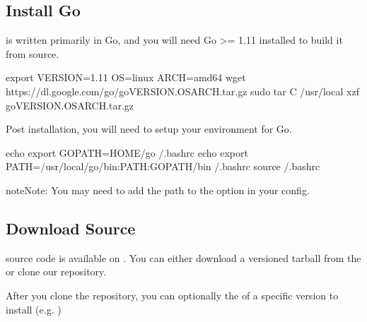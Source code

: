 \documentclass[letterpaper,10pt,english]{sphinxmanual}
\begin{document}
\subsection{Install Go}
\label{\detokenize{admin_quickstart:install-go}}
 is written primarily in Go, and you will need Go \textgreater{}= 1.11
installed to build it from source.

%
\begin{sphinxVerbatim}[commandchars=\\\{\}]
\PYGZdl{} export VERSION=1.11 OS=linux ARCH=amd64
\PYGZdl{} wget https://dl.google.com/go/go\PYGZdl{}VERSION.\PYGZdl{}OS\PYGZhy{}\PYGZdl{}ARCH.tar.gz
\PYGZdl{} sudo tar \PYGZhy{}C /usr/local \PYGZhy{}xzf go\PYGZdl{}VERSION.\PYGZdl{}OS\PYGZhy{}\PYGZdl{}ARCH.tar.gz
\end{sphinxVerbatim}

Post installation, you will need to setup your environment for Go.

%
\begin{sphinxVerbatim}[commandchars=\\\{\}]
\PYGZdl{} echo \PYGZsq{}export GOPATH=\PYGZdl{}\PYGZob{}HOME\PYGZcb{}/go\PYGZsq{} \PYGZgt{}\PYGZgt{} \PYGZti{}/.bashrc
\PYGZdl{} echo \PYGZsq{}export PATH=/usr/local/go/bin:\PYGZdl{}\PYGZob{}PATH\PYGZcb{}:\PYGZdl{}\PYGZob{}GOPATH\PYGZcb{}/bin\PYGZsq{} \PYGZgt{}\PYGZgt{} \PYGZti{}/.bashrc
\PYGZdl{} source \PYGZti{}/.bashrc
\end{sphinxVerbatim}

\begin{sphinxadmonition}{note}{Note:}
You may need to add the path  to the
 option in your  config.
\end{sphinxadmonition}


\subsection{Download Source}
\label{\detokenize{admin_quickstart:download-source}}
 source code is available on . You can either
download a versioned tarball from the
 or
clone our  repository.

After you clone the  repository, you can optionally  the
 of a specific version to install (e.g. )
\end{document}
